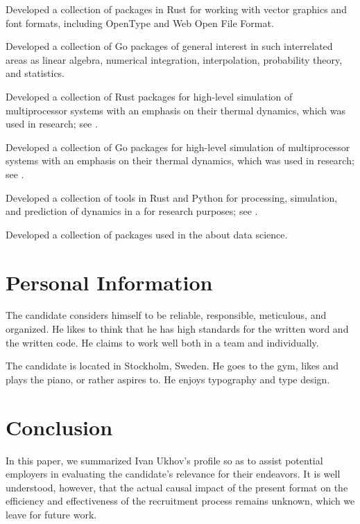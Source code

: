 \documentclass[journal]{IEEEtran}
\begin{document}
\emph{} Developed
a collection of packages in Rust for working with vector graphics and font
formats, including OpenType and Web Open File Format.

\emph{} Developed a collection of Go packages of general interest in such
interrelated areas as linear algebra, numerical integration, interpolation,
probability theory, and statistics.

\emph{} Developed a collection of Rust packages for high-level simulation of
multiprocessor systems with an emphasis on their thermal dynamics, which was
used in research; see .

\emph{} Developed a collection of Go packages for
high-level simulation of multiprocessor systems with an emphasis on their
thermal dynamics, which was used in research; see .

\emph{} Developed a collection of tools in Rust and
Python for processing, simulation, and prediction of dynamics in a
 for research
purposes; see .

\emph{} Developed a collection of packages used in the
 about data science.

\section{Personal Information} 

The candidate considers himself to be reliable, responsible, meticulous, and
organized. He likes to think that he has high standards for the written word and
the written code. He claims to work well both in a team and individually.

The candidate is located in Stockholm, Sweden. He goes to the gym, likes
 and
plays the piano, or rather aspires to. He enjoys typography and type design.

\section{Conclusion} 

In this paper, we summarized Ivan Ukhov's profile so as to assist potential
employers in evaluating the candidate's relevance for their endeavors. It is
well understood, however, that the actual causal impact of the present format on
the efficiency and effectiveness of the recruitment process remains unknown,
which we leave for future work.

\begingroup
  
  
\endgroup
\end{document}
